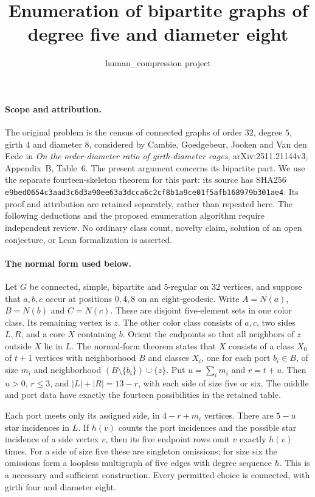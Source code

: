 \documentclass[11pt]{article}
\title{Enumeration of bipartite graphs of degree five and diameter eight}
\author{human\_compression project}
\date{}
\begin{document}
\maketitle

\paragraph{Scope and attribution.}
The original problem is the census of connected graphs of order $32$,
degree $5$, girth $4$ and diameter $8$, considered by Cambie, Goedgebeur,
Jooken and Van den Eede in \emph{On the order-diameter ratio of
girth-diameter cages}, arXiv:2511.21144v3, Appendix~B, Table~6.
The present argument concerns its bipartite part. We use the separate
fourteen-skeleton theorem for this part: its source has SHA256
\texttt{e9bed0654c3aad3c6d3a90ee63a3dcca6c2cf8b1a9ce01f5afb168979b301ae4}.
Its proof and attribution are retained separately, rather than repeated
here. The following deductions and the proposed enumeration algorithm
require independent review. No ordinary class count, novelty claim,
solution of an open conjecture, or Lean formalization is asserted.

\paragraph{The normal form used below.}
Let $G$ be connected, simple, bipartite and $5$-regular on $32$ vertices,
and suppose that $a,b,c$ occur at positions $0,4,8$ on an eight-geodesic.
Write $A=N(a)$, $B=N(b)$ and $C=N(c)$. These are disjoint five-element
sets in one color class. Its remaining vertex is $z$. The other color
class consists of $a,c$, two sides $L,R$, and a core $X$ containing $b$.
Orient the endpoints so that all neighbors of $z$ outside $X$ lie in $L$.
The normal-form theorem states that $X$ consists of a class $X_0$ of
$t+1$ vertices with neighborhood $B$ and classes $X_i$, one for each
port $b_i\in B$, of size $m_i$ and neighborhood
$(B\setminus\{b_i\})\cup\{z\}$. Put $u=\sum_i m_i$ and $r=t+u$.
Then $u>0$, $r\leq3$, and $|L|+|R|=13-r$, with each side of size five
or six. The middle and port data have exactly the fourteen possibilities
in the retained table.

Each port meets only its assigned side, in $4-r+m_i$ vertices. There are
$5-u$ star incidences in $L$. If $h(v)$ counts the port incidences and
the possible star incidence of a side vertex $v$, then its five endpoint
rows omit $v$ exactly $h(v)$ times. For a side of size five these are
singleton omissions; for size six the omissions form a loopless
multigraph of five edges with degree sequence $h$. This is a necessary
and sufficient construction. Every permitted choice is connected, with
girth four and diameter eight.
\end{document}
